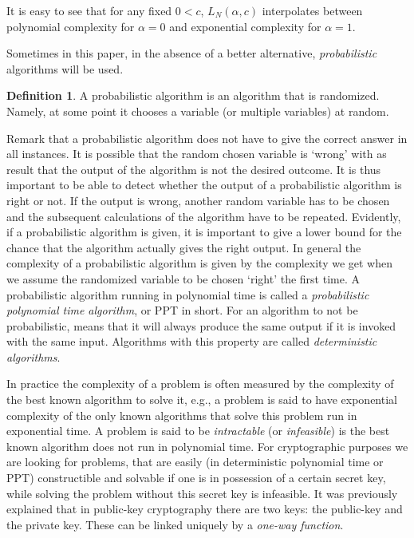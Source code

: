 \documentclass{article}
\numberwithin{equation}{section}
\theoremstyle{definition}
\newtheorem{definition}[theorem]{Definition}
\begin{document}
It is easy to see that for any fixed $0<c$, $L_N(\alpha,c)$ interpolates between polynomial complexity for $\alpha = 0$ and exponential complexity for $\alpha = 1$.\par
Sometimes in this paper, in the absence of a better alternative, \emph{probabilistic} algorithms will be used.

\begin{definition}
A probabilistic algorithm is an algorithm that is randomized. Namely, at some point it chooses a variable (or multiple variables) at random.
\end{definition}

Remark that a probabilistic algorithm does not have to give the correct answer in all instances. It is possible that the random chosen variable is `wrong' with as result that the output of the algorithm is not the desired outcome. It is thus important to be able to detect whether the output of a probabilistic algorithm is right or not. If the output is wrong, another random variable has to be chosen and the subsequent calculations of the algorithm have to be repeated. Evidently, if a probabilistic algorithm is given, it is important to give a lower bound for the chance that the algorithm actually gives the right output. In general the complexity of a probabilistic algorithm is given by the complexity we get when we assume the randomized variable to be chosen `right' the first time. A probabilistic algorithm running in polynomial time is called a \emph{probabilistic polynomial time algorithm}, or PPT in short. For an algorithm to not be probabilistic, means that it will always produce the same output if it is invoked with the same input. Algorithms with this property are called \emph{deterministic algorithms}.\par  
In practice the complexity of a problem is often measured by the complexity of the best known algorithm to solve it, e.g., a problem is said to have exponential complexity of the only known algorithms that solve this problem run in exponential time. A problem is said to be \emph{intractable} (or \emph{infeasible}) is the best known algorithm does not run in polynomial time. For cryptographic purposes we are looking for problems, that are easily (in deterministic polynomial time or PPT) constructible and solvable if one is in possession of a certain secret key, while solving the problem without this secret key is infeasible.
It was previously explained that in public-key cryptography there are two keys: the public-key and the private key. These can be linked uniquely by a \emph{one-way function}.
\end{document}
